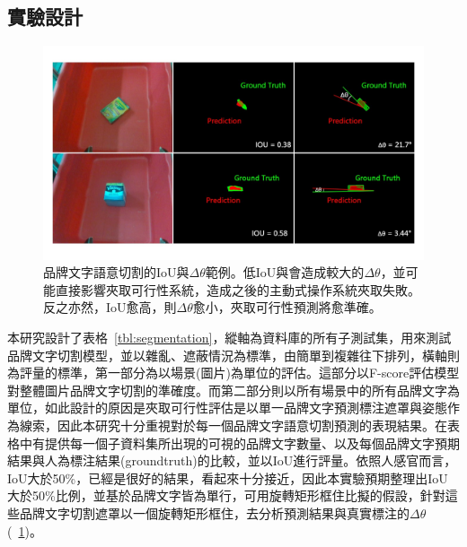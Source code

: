 \subsection{實驗設計}

\begin{figure}[ht]
	\centering
	\includegraphics[height=!, width=1.0\linewidth, keepaspectratio=true]
	{./figures/iou_deltatheta.jpg}
  \caption{品牌文字語意切割的IoU與$\Delta\theta$範例。低IoU與會造成較大的$\Delta\theta$，並可能直接影響夾取可行性系統，造成之後的主動式操作系統夾取失敗。反之亦然，IoU愈高，則$\Delta\theta$愈小，夾取可行性預測將愈準確。}
  \label{figure:iou_deltatheta}
\end{figure}

本研究設計了表格~\ref{tbl:segmentation}，縱軸為資料庫的所有子測試集，用來測試品牌文字切割模型，並以雜亂、遮蔽情況為標準，由簡單到複雜往下排列，橫軸則為評量的標準，第一部分為以場景(圖片)為單位的評估。這部分以F-score評估模型對整體圖片品牌文字切割的準確度。而第二部分則以所有場景中的所有品牌文字為單位，如此設計的原因是夾取可行性評估是以單一品牌文字預測標注遮罩與姿態作為線索，因此本研究十分重視對於每一個品牌文字語意切割預測的表現結果。在表格中有提供每一個子資料集所出現的可視的品牌文字數量、以及每個品牌文字預期結果與人為標注結果(groundtruth)的比較，並以IoU進行評量。依照人感官而言，IoU大於50\%，已經是很好的結果，看起來十分接近，因此本實驗預期整理出IoU大於50\%比例，並基於品牌文字皆為單行，可用旋轉矩形框住比擬的假設，針對這些品牌文字切割遮罩以一個旋轉矩形框住，去分析預測結果與真實標注的$\Delta\theta$(~\ref{figure:iou_deltatheta})。

